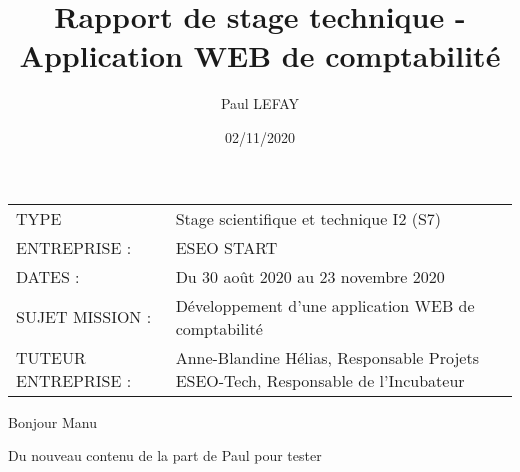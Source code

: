 \documentclass[twoside]{article}
\title{Rapport de stage technique - Application WEB de comptabilité}
\author{Paul LEFAY}
\date{02/11/2020}
\begin{document}
\cfoot{\thepage}

\maketitle{}										%

\begin{center}
	\begin{tabular}{ m{8cm} m{8cm} }
	TYPE & \mbox{\ooalign{$\checkmark$\cr\hidewidth$\square$\hidewidth\cr}}  Stage scientifique et technique I2 (S7) \\
   ENTREPRISE :  & ESEO START \\
   DATES : & Du 30 août 2020 au 23 novembre 2020 \\
   SUJET MISSION : & Développement d'une application WEB de comptabilité \\
   TUTEUR ENTREPRISE :  & Anne-Blandine Hélias, Responsable Projets ESEO-Tech, Responsable de l'Incubateur
 \end{tabular}
\end{center}

\newpage
Bonjour Manu

Du nouveau contenu de la part de Paul pour tester
\end{document}
